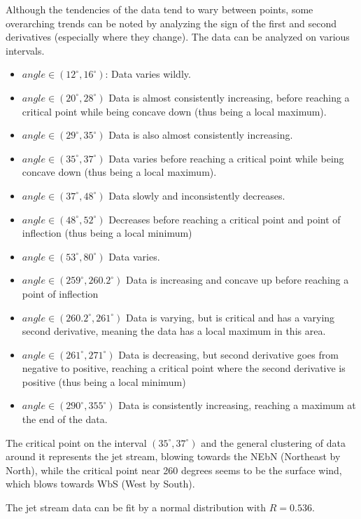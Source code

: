 \documentclass{journal}
\begin{document}
Although the tendencies of the data tend to wary between points, some overarching trends can be noted by analyzing the sign of the first and second derivatives (especially where they change).
The data can be analyzed on various intervals.
\begin{itemize}
  \item $angle \in (12^{\circ},16^{\circ})$: Data varies wildly.
  \item $angle \in (20^{\circ}, 28^{\circ})$ Data is almost consistently increasing, before reaching a critical point while being concave down (thus being a local maximum).
  \item $angle \in (29^{\circ}, 35^{\circ})$ Data is also almost consistently increasing.
  \item $angle \in (35^{\circ}, 37^{\circ})$ Data varies before reaching a critical point while being concave down (thus being a local maximum).
  \item $angle \in (37^{\circ}, 48^{\circ})$ Data slowly and inconsistently decreases.
  \item $angle \in (48^{\circ}, 52^{\circ})$ Decreases before reaching a critical point and point of inflection (thus being a local minimum)
  \item $angle \in (53^{\circ}, 80^{\circ})$ Data varies.
  \item $angle \in (259^{\circ}, 260.2^{\circ})$ Data is increasing and concave up before reaching a point of inflection
  \item $angle \in (260.2^{\circ}, 261^{\circ})$ Data is varying, but is critical and has a varying second derivative, meaning the data has a local maximum in this area.
  \item $angle \in (261^{\circ}, 271^{\circ})$ Data is decreasing, but second derivative goes from negative to positive, reaching a critical point where the second derivative is positive (thus being a local minimum)
  \item $angle \in (290^{\circ}, 355^{\circ})$ Data is consistently increasing, reaching a maximum at the end of the data.
\end{itemize}

The critical point on the interval $(35^{\circ}, 37^{\circ})$ and the general clustering of data around it represents the jet stream, blowing towards the NEbN (Northeast by North), while the critical point near 260 degrees seems to be the surface wind, which blows towards WbS (West by South).

The jet stream data can be fit by a normal distribution with $R = 0.536$.
\end{document}
